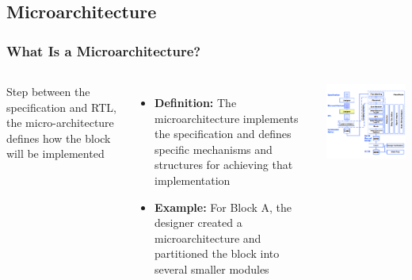 \documentclass[compress]{beamer}
\begin{document}
\subsection[Block]{Microarchitecture}
\begin{frame}
	\frametitle{What Is a Microarchitecture?}
	\begin{columns}	
		Step between the specification and
		RTL, the micro-architecture defines how
		the block will be implemented
		\begin{itemize}
			\item \textbf{Definition:} The microarchitecture
			implements the specification and
			defines specific mechanisms and
			structures for achieving that
			implementation
			\item \textbf{Example:} For Block A, the
			designer created a
			microarchitecture and partitioned
			the block into several smaller
			modules
		\end{itemize}
		\begin{center}
			\includegraphics[width=\textwidth]{micro}
		\end{center}
	\end{columns}
\end{frame}
\end{document}

